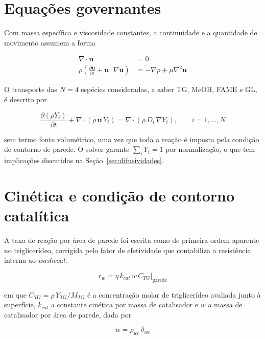 \section{Equações governantes}

Com massa específica e viscosidade constantes, a continuidade e a quantidade de
movimento assumem a forma

\begin{align}
\nabla \cdot \mathbf{u} &= 0 \label{eq:continuidade}\\[4pt]
\rho \left( \frac{\partial \mathbf{u}}{\partial t} + \mathbf{u} \cdot \nabla \mathbf{u} \right)
&= -\nabla p + \mu \nabla^2 \mathbf{u} \label{eq:momento}
\end{align}

O transporte das $N = 4$ espécies consideradas, a saber TG, MeOH, FAME e GL, é
descrito por

\begin{equation}
\frac{\partial (\rho Y_i)}{\partial t} + \nabla \cdot (\rho\, \mathbf{u}\, Y_i)
= \nabla \cdot \left( \rho\, D_i\, \nabla Y_i \right),
\qquad i = 1, \ldots, N
\label{eq:especies}
\end{equation}

\noindent
sem termo fonte volumétrico, uma vez que toda a reação é imposta pela condição
de contorno de parede. O solver garante $\sum_i Y_i = 1$ por normalização, o que
tem implicações discutidas na Seção~\ref{sec:difusividades}.

\section{Cinética e condição de contorno catalítica}
\label{sec:bc}

A taxa de reação por área de parede foi escrita como de primeira ordem aparente
no triglicerídeo, corrigida pelo fator de efetividade que contabiliza a
resistência interna ao \textit{washcoat}:

\begin{equation}
r_w = \eta\, k_{cat}\, w\, C_{TG}\big|_{\text{parede}}
\label{eq:rw}
\end{equation}

\noindent
em que $C_{TG} = \rho\, Y_{TG}/M_{TG}$ é a concentração molar de triglicerídeo
avaliada junto à superfície, $k_{cat}$ a constante cinética por massa de
catalisador e $w$ a massa de catalisador por área de parede, dada por

\begin{equation}
w = \rho_{wc}\, \delta_{wc}
\label{eq:w}
\end{equation}

